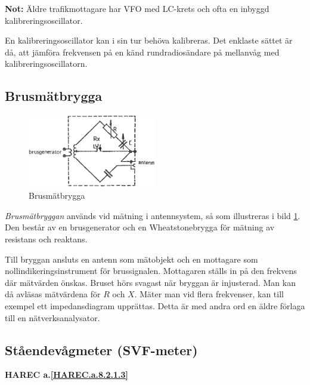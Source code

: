 \textbf{Not:}
Äldre trafikmottagare har VFO med LC-krets och ofta en inbyggd
kalibreringsoscillator.

En kalibreringsoscillator kan i sin tur behöva kalibreras.
Det enklaste sättet är då, att jämföra frekvensen på en känd rundradiosändare
på mellanvåg med kalibreringsoscillatorn.

\subsection{Brusmätbrygga}

\begin{figure}
  \includegraphics[width=0.5\textwidth]{images/cropped_pdfs/bild_2_8-08.pdf}
  \caption{Brusmätbrygga}
  \label{fig:bildII8-8}
\end{figure}

\emph{Brusmätbryggan} används vid mätning i antennsystem, så som illustreras i
bild \ref{fig:bildII8-8}.
Den består av en brusgenerator och en Wheatstonebrygga för mätning av
resistans och reaktans.

Till bryggan ansluts en antenn som mätobjekt och en mottagare som
nollindikeringsinstrument för brussignalen.
Mottagaren ställs in på den frekvens där mätvärden önskas.
Bruset hörs svagast när bryggan är injusterad.
Man kan då avläsas mätvärdena för \(R\) och \(X\).
Mäter man vid flera frekvenser, kan till exempel ett impedansdiagram upprättas.
Detta är med andra ord en äldre förlaga till en nätverksanalysator.

\subsection{Ståendevågmeter (SVF-meter)}
\textbf{
HAREC a.\ref{HAREC.a.8.2.1.3}\label{myHAREC.a.8.2.1.3}
}
\label{SVF}

